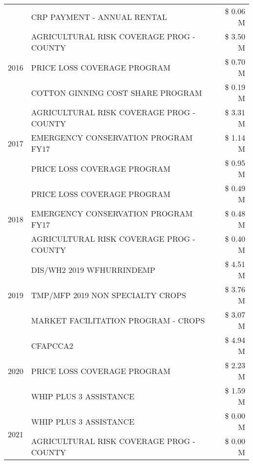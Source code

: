 \begin{tabular}{llr}
 & CRP PAYMENT - ANNUAL RENTAL & \$ 0.06 M \\
\cline{1-3}
\multirow[t]{3}{*}{2016} & AGRICULTURAL RISK COVERAGE PROG - COUNTY & \$ 3.50 M \\
 & PRICE LOSS COVERAGE PROGRAM & \$ 0.70 M \\
 & COTTON GINNING COST SHARE PROGRAM & \$ 0.19 M \\
\cline{1-3}
\multirow[t]{3}{*}{2017} & AGRICULTURAL RISK COVERAGE PROG - COUNTY & \$ 3.31 M \\
 & EMERGENCY CONSERVATION PROGRAM FY17 & \$ 1.14 M \\
 & PRICE LOSS COVERAGE PROGRAM & \$ 0.95 M \\
\cline{1-3}
\multirow[t]{3}{*}{2018} & PRICE LOSS COVERAGE PROGRAM & \$ 0.49 M \\
 & EMERGENCY CONSERVATION PROGRAM FY17 & \$ 0.48 M \\
 & AGRICULTURAL RISK COVERAGE PROG - COUNTY & \$ 0.40 M \\
\cline{1-3}
\multirow[t]{3}{*}{2019} & DIS/WH2 2019 WFHURRINDEMP & \$ 4.51 M \\
 & TMP/MFP 2019 NON SPECIALTY CROPS & \$ 3.76 M \\
 & MARKET FACILITATION PROGRAM - CROPS & \$ 3.07 M \\
\cline{1-3}
\multirow[t]{3}{*}{2020} & CFAPCCA2 & \$ 4.94 M \\
 & PRICE LOSS COVERAGE PROGRAM & \$ 2.23 M \\
 & WHIP PLUS 3 ASSISTANCE & \$ 1.59 M \\
\cline{1-3}
\multirow[t]{2}{*}{2021} & WHIP PLUS 3 ASSISTANCE & \$ 0.00 M \\
 & AGRICULTURAL RISK COVERAGE PROG - COUNTY & \$ 0.00 M \\
\cline{1-3}
\bottomrule
\end{tabular}
